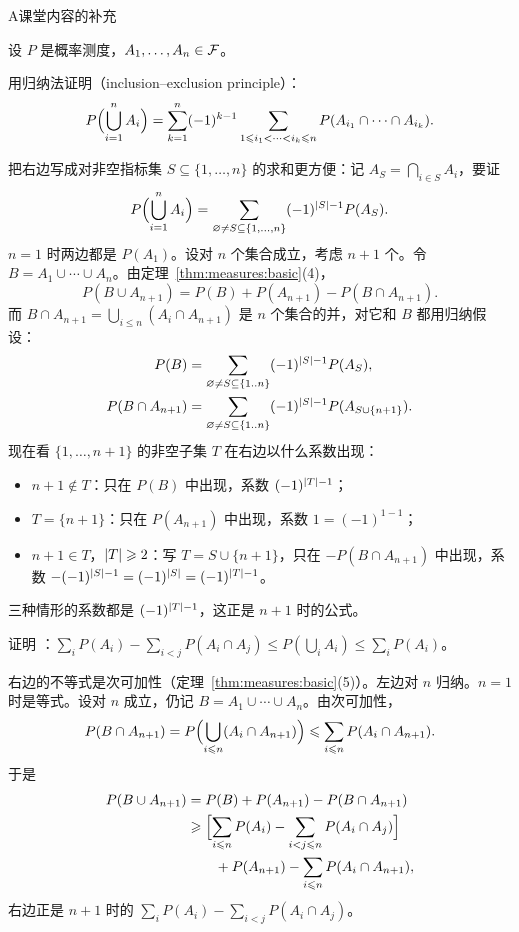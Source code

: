 \begin{exercises}{A}{课堂内容的补充}
\item\label{ex:measures:A2} 设 $P$ 是概率测度，$A_1,\dots,A_n\in\mathcal{F}$。
\begin{questions}
\item 用归纳法证明（inclusion–exclusion principle）：
\[
P\Bigl(\bigcup_{i=1}^nA_i\Bigr)=\sum_{k=1}^n(-1)^{k-1}\sum_{1\leqslant i_1<\cdots<i_k\leqslant n}P(A_{i_1}\cap\cdots\cap A_{i_k}).
\]
\begin{solution}
把右边写成对非空指标集 $S\subseteq\{1,\dots,n\}$ 的求和更方便：记 $A_S=\bigcap_{i\in S}A_i$，要证
\[
P\Bigl(\bigcup_{i=1}^nA_i\Bigr)=\sum_{\varnothing\neq S\subseteq\{1,\dots,n\}}(-1)^{\lvert S\rvert-1}P(A_S).
\]
$n=1$ 时两边都是 $P(A_1)$。设对 $n$ 个集合成立，考虑 $n+1$ 个。令 $B=A_1\cup\cdots\cup A_n$。由定理~\ref{thm:measures:basic}(4)，
\[
P(B\cup A_{n+1})=P(B)+P(A_{n+1})-P(B\cap A_{n+1}).
\]
而 $B\cap A_{n+1}=\bigcup_{i\leqslant n}(A_i\cap A_{n+1})$ 是 $n$ 个集合的并，对它和 $B$ 都用归纳假设：
\[
\begin{aligned}
P(B)&=\sum_{\varnothing\neq S\subseteq\{1..n\}}(-1)^{\lvert S\rvert-1}P(A_S),\\
P(B\cap A_{n+1})&=\sum_{\varnothing\neq S\subseteq\{1..n\}}(-1)^{\lvert S\rvert-1}P(A_{S\cup\{n+1\}}).
\end{aligned}
\]
现在看 $\{1,\dots,n+1\}$ 的非空子集 $T$ 在右边以什么系数出现：
\begin{itemize}
\item $n+1\notin T$：只在 $P(B)$ 中出现，系数 $(-1)^{\lvert T\rvert-1}$；
\item $T=\{n+1\}$：只在 $P(A_{n+1})$ 中出现，系数 $1=(-1)^{1-1}$；
\item $n+1\in T$，$\lvert T\rvert\geqslant2$：写 $T=S\cup\{n+1\}$，只在 $-P(B\cap A_{n+1})$ 中出现，系数 $-(-1)^{\lvert S\rvert-1}=(-1)^{\lvert S\rvert}=(-1)^{\lvert T\rvert-1}$。
\end{itemize}
三种情形的系数都是 $(-1)^{\lvert T\rvert-1}$，这正是 $n+1$ 时的公式。
\end{solution}
\item 证明 ：$\sum_iP(A_i)-\sum_{i<j}P(A_i\cap A_j)\leqslant P(\bigcup_iA_i)\leqslant\sum_iP(A_i)$。
\begin{solution}
右边的不等式是次可加性（定理~\ref{thm:measures:basic}(5)）。左边对 $n$ 归纳。$n=1$ 时是等式。设对 $n$ 成立，仍记 $B=A_1\cup\cdots\cup A_n$。由次可加性，
\[
P(B\cap A_{n+1})=P\Bigl(\bigcup_{i\leqslant n}(A_i\cap A_{n+1})\Bigr)\leqslant\sum_{i\leqslant n}P(A_i\cap A_{n+1}).
\]
于是
\[
\begin{aligned}
P(B\cup A_{n+1})&=P(B)+P(A_{n+1})-P(B\cap A_{n+1})\\
&\geqslant\Bigl[\sum_{i\leqslant n}P(A_i)-\sum_{i<j\leqslant n}P(A_i\cap A_j)\Bigr]\\
&\qquad+P(A_{n+1})-\sum_{i\leqslant n}P(A_i\cap A_{n+1}),
\end{aligned}
\]
右边正是 $n+1$ 时的 $\sum_iP(A_i)-\sum_{i<j}P(A_i\cap A_j)$。


\end{solution}
\end{questions}
\end{exercises}
